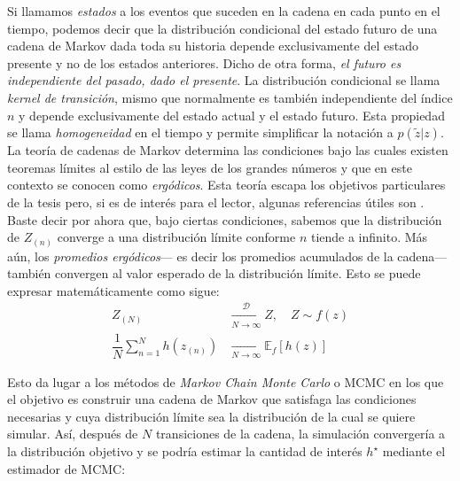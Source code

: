 Si llamamos \textit{estados} a los eventos que suceden en la cadena en cada punto en el tiempo, podemos decir que la distribución condicional del estado futuro de una cadena de Markov dada toda su historia depende exclusivamente del estado presente y no de los estados anteriores. Dicho de otra forma, \textit{el futuro es independiente del pasado, dado el presente}. La distribución condicional se llama \textit{kernel de transición}, mismo que normalmente es también independiente del índice $n$ y depende exclusivamente del estado actual y el estado futuro. Esta propiedad se llama \textit{homogeneidad} en el tiempo y permite simplificar la notación a $p(\tilde{z}|z)$.\\ 

La teoría de cadenas de Markov determina las condiciones bajo las cuales existen teoremas límites al estilo de las leyes de los grandes números y que en este contexto se conocen como \textit{ergódicos}. Esta teoría escapa los objetivos particulares de la tesis pero, si es de interés para el lector, algunas referencias útiles son \textcites{Rincon12,Neal93,Ross96,TaylorKarlin84}. Baste decir por ahora que, bajo ciertas condiciones, sabemos que la distribución de $Z_{(n)}$ converge a una distribución límite conforme $n$ tiende a infinito. Más aún, los \textit{promedios ergódicos}--- es decir los promedios acumulados de la cadena--- también convergen al valor esperado de la distribución límite. Esto se puede expresar matemáticamente como sigue:
\begin{subequations}\label{eq:Teo_Erg}
\begin{align}
Z_{(N)} &\xrightarrow[N\rightarrow\infty]{\mathcal{D}} Z, \quad Z \sim f(z) \label{eq:Teo_Erg_Conv_D} \\
\dfrac{1}{N}\sum\limits_{n=1}^N h(z_{(n)}) &\xrightarrow[N\rightarrow\infty]{} \mathbb{E}_{f}[h(z)]
\label{eq:Teo_Erg_Conv_Prom}
\end{align}
\end{subequations}

Esto da lugar a los métodos de \textit{Markov Chain Monte Carlo} o MCMC en los que el objetivo es construir una cadena de Markov que satisfaga las condiciones necesarias y cuya distribución límite sea la distribución de la cual se quiere simular. Así, después de $N$ transiciones de la cadena, la simulación convergería a la distribución objetivo y se podría estimar la cantidad de interés $h^\star$ mediante el estimador de MCMC: 

